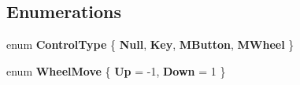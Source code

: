 \subsection*{Enumerations}
\begin{DoxyCompactItemize}
\item 
enum {\bfseries Control\+Type} \{ {\bfseries Null}, 
{\bfseries Key}, 
{\bfseries M\+Button}, 
{\bfseries M\+Wheel}
 \}\hypertarget{Control_8hh_a8005f1f182fd0248a710ca64f72508d4}{}\label{Control_8hh_a8005f1f182fd0248a710ca64f72508d4}

\item 
enum {\bfseries Wheel\+Move} \{ {\bfseries Up} = -\/1, 
{\bfseries Down} = 1
 \}\hypertarget{Control_8hh_ad869e3b0cbdf01650550be2582e42c1e}{}\label{Control_8hh_ad869e3b0cbdf01650550be2582e42c1e}

\end{DoxyCompactItemize}
